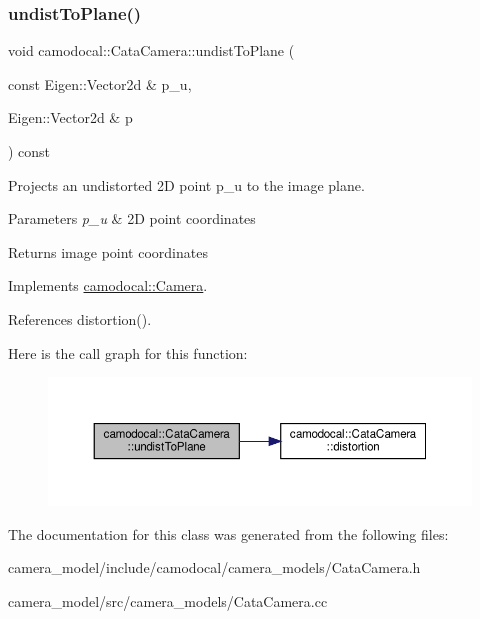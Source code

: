 \subsubsection{\texorpdfstring{undist\+To\+Plane()}{undistToPlane()}}
{\footnotesize\ttfamily void camodocal\+::\+Cata\+Camera\+::undist\+To\+Plane (\begin{DoxyParamCaption}\item[{const Eigen\+::\+Vector2d \&}]{p\+\_\+u,  }\item[{Eigen\+::\+Vector2d \&}]{p }\end{DoxyParamCaption}) const\hspace{0.3cm}{\ttfamily [virtual]}}



Projects an undistorted 2D point p\+\_\+u to the image plane. 


\begin{DoxyParams}{Parameters}
{\em p\+\_\+u} & 2D point coordinates \\
\hline
\end{DoxyParams}
\begin{DoxyReturn}{Returns}
image point coordinates 
\end{DoxyReturn}


Implements \hyperlink{classcamodocal_1_1Camera}{camodocal\+::\+Camera}.



References distortion().

Here is the call graph for this function\+:\nopagebreak
\begin{figure}[H]
\begin{center}
\leavevmode
\includegraphics[width=350pt]{classcamodocal_1_1CataCamera_a9184557401622acaf2a00fd9b1295d13_cgraph}
\end{center}
\end{figure}


The documentation for this class was generated from the following files\+:\begin{DoxyCompactItemize}
\item 
camera\+\_\+model/include/camodocal/camera\+\_\+models/Cata\+Camera.\+h\item 
camera\+\_\+model/src/camera\+\_\+models/Cata\+Camera.\+cc\end{DoxyCompactItemize}
